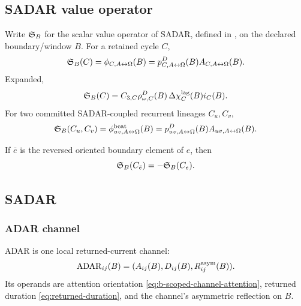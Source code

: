 \subsection{SADAR value operator}\label{subsec:sadar-operator}
\begin{definition}
Write \(\mathfrak S_B\) for the scalar value operator of SADAR, defined in , on the declared boundary/window \(B\). For a retained cycle \(C\),
\begin{equation}
\mathfrak S_B(C)
=
\phi_{C,A{\leftrightarrow}\Omega}(B)
=
p^D_{C,A{\leftrightarrow}\Omega}(B)A_{C,A{\leftrightarrow}\Omega}(B).
\label{eq:sadar-operator-cycle}
\end{equation}
Expanded,
\begin{equation}
\mathfrak S_B(C)
=
C_{3,C}\rho^D_{\omega,C}(B)\,\Delta\chi_C^{\mathrm{lag}}(B)i_C(B).
\label{eq:sadar-operator-expanded}
\end{equation}
For two committed SADAR-coupled recurrent lineages \(C_u,C_v\),
\begin{equation}
\mathfrak S_B(C_u,C_v)
=
\phi^{\mathrm{beat}}_{uv,A{\leftrightarrow}\Omega}(B)
=
p^D_{uv,A{\leftrightarrow}\Omega}(B)A_{uv,A{\leftrightarrow}\Omega}(B).
\label{eq:sadar-operator-beat-coupling}
\end{equation}
\end{definition}
If \(\bar e\) is the reversed oriented boundary element of \(e\), then
\begin{equation}
\mathfrak S_B(C_{\bar e})=-\mathfrak S_B(C_e).
\label{eq:sadar-orientation-antisymmetry}
\end{equation}


\subsection{SADAR}\label{sec:field:sadar}
\label{subsec:sadar}

\subsubsection{ADAR channel}\label{subsec:adar-channel}
\begin{definition}[ADAR]
ADAR is one local returned-current channel:
\begin{equation}
\mathrm{ADAR}_{ij}(B)=(A_{ij}(B),D_{ij}(B),R^{\mathrm{asym}}_{ij}(B)).
\label{eq:adar-channel}
\end{equation}
Its operands are attention orientation \eqref{eq:b-scoped-channel-attention},
returned duration \eqref{eq:returned-duration}, and the channel's asymmetric
reflection on \(B\).
\end{definition}

